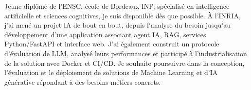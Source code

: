 
\begin{cvparagraph}
Jeune diplômé de l’ENSC, école de Bordeaux INP, spécialisé en intelligence artificielle et sciences cognitives, je suis disponible dès que possible. À l’INRIA, j’ai mené un projet IA de bout en bout, depuis l’analyse du besoin jusqu’au développement d’une application associant agent IA, RAG, services Python/FastAPI et interface web. J’ai également construit un protocole d’évaluation de LLM, analysé leurs performances et participé à l’industrialisation de la solution avec Docker et CI/CD. Je souhaite poursuivre dans la conception, l’évaluation et le déploiement de solutions de Machine Learning et d’IA générative répondant à des besoins métiers concrets.
\end{cvparagraph}
